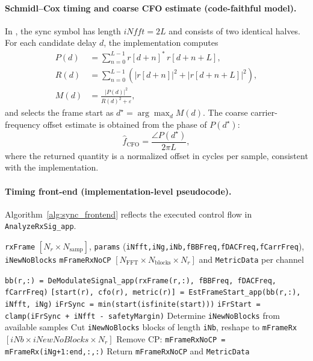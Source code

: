 \paragraph{Schmidl--Cox timing and coarse CFO estimate (code-faithful model).}
In , the sync symbol has length $iNfft=2L$ and consists of two identical halves. For each candidate delay $d$, the implementation computes
\begin{align}
P(d) &= \sum_{n=0}^{L-1} r[d+n]^*\, r[d+n+L],\\
R(d) &= \sum_{n=0}^{L-1} \left(|r[d+n]|^2 + |r[d+n+L]|^2\right),\\
M(d) &= \frac{|P(d)|^2}{R(d)^2+\varepsilon},
\end{align}
and selects the frame start as $d^\star = \arg\max_d M(d)$. The coarse carrier-frequency offset estimate is obtained from the phase of $P(d^\star)$:
\begin{equation}
\hat{f}_{\mathrm{CFO}} = \frac{\angle P(d^\star)}{2\pi L},
\end{equation}
where the returned quantity is a normalized offset in cycles per sample, consistent with the implementation.

\paragraph{Timing front-end (implementation-level pseudocode).}
Algorithm~\ref{alg:sync_frontend} reflects the executed control flow in \texttt{AnalyzeRxSig\_app}.

\begin{algorithm}[t]
\caption{Front-end synchronization and OFDM block extraction (\texttt{AnalyzeRxSig\_app})}
\label{alg:sync_frontend}
\begin{algorithmic}[1]
\Require \texttt{rxFrame} $[N_r\times N_{\mathrm{samp}}]$, \texttt{params} (\texttt{iNfft,iNg,iNb,fBBFreq,fDACFreq,fCarrFreq}), \texttt{iNewNoBlocks}
\Ensure \texttt{mFrameRxNoCP} $[N_{\mathrm{FFT}} \times N_{\mathrm{blocks}} \times N_{r}]$ and \texttt{MetricData} per channel

  \State \texttt{bb(r,:) = DeModulateSignal\_app(rxFrame(r,:), fBBFreq, fDACFreq, fCarrFreq)}
\EndFor
{}
  \State \texttt{[start(r), cfo(r), metric(r)] = EstFrameStart\_app(bb(r,:), iNfft, iNg)}
\EndFor
\State \texttt{iFrSync = min(start(isfinite(start)))}
\State \texttt{iFrStart = clamp(iFrSync + iNfft - safetyMargin)}
\State Determine \texttt{iNewNoBlocks} from available samples
\State Cut \texttt{iNewNoBlocks} blocks of length \texttt{iNb}, reshape to \texttt{mFrameRx} $[iNb \times iNewNoBlocks \times N_{r}]$
\State Remove CP: \texttt{mFrameRxNoCP = mFrameRx(iNg+1:end,:,:)}
\State Return \texttt{mFrameRxNoCP} and \texttt{MetricData}
\end{algorithmic}
\end{algorithm}

